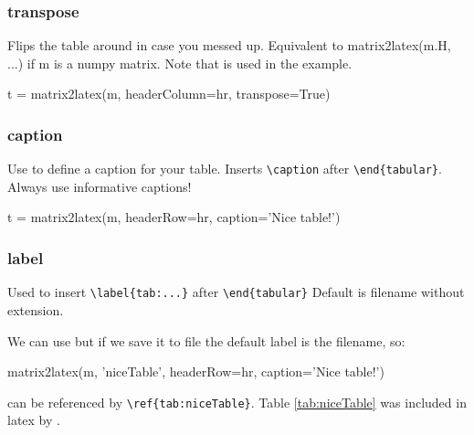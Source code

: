 \subsubsection{transpose}
Flips the table around in case you messed up. Equivalent to
matrix2latex(m.H, ...)
if m is a numpy matrix.
Note that  is used in the example.
\begin{pyblock}
t = matrix2latex(m, headerColumn=hr, transpose=True)
\end{pyblock}

\subsubsection{caption}
    Use to define a caption for your table.
    Inserts \verb!\caption! after \verb!\end{tabular}!.
Always use informative captions!
\begin{pyblock}
t = matrix2latex(m, headerRow=hr,
                 caption='Nice table!')
\end{pyblock}

\subsubsection{label}
Used to insert \verb!\label{tab:...}! after \verb!\end{tabular}!
Default is filename without extension.

We can use  but if we save it to file
the default label is the filename, so:
\begin{pyblock}
matrix2latex(m, 'niceTable', headerRow=hr, 
                 caption='Nice table!')
\end{pyblock}
can be referenced by \verb!\ref{tab:niceTable}!. Table \ref{tab:niceTable}
was included in latex by \verb!!.


